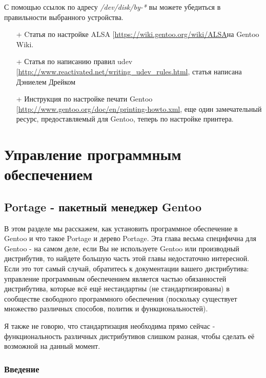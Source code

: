 \documentclass[10pt]{book}
\begin{document}
С помощью ссылок по адресу \textit{/dev/disk/by-*} вы можете убедиться в правильности выбранного устройства.

\newpage

\phantom{}
\begin{tcolorbox}[title=\textbf{Дальнейшие ресурсы}, colback=yellow!14!white, colframe=red!75!blue]
\begin{itemize}
	\item[+] Cтатья по настройке ALSA [\url{https://wiki.gentoo.org/wiki/ALSA}на Gentoo Wiki.
	\item[+] Статья по написанию правил udev [\url{http://www.reactivated.net/writing_udev_rules.html}, статья написана Дэниелем Дрейком
	\item[+] Инструкция по настройке печати Gentoo [\url{http://www.gentoo.org/doc/en/printing-howto.xml}, еще один замечательный ресурс, предоставляемый для Gentoo, теперь по настройке принтера.
\end{itemize}
\end{tcolorbox}

\newpage

\chapter{Управление программным обеспечением}

\section*{Portage - пакетный менеджер Gentoo}

В этом разделе мы расскажем, как установить программное обеспечение в Gentoo и что такое Portage и дерево Portage. Эта глава весьма специфична для Gentoo - на самом деле, если Вы не используете Gentoo или производный дистрибутив, то найдете большую часть этой главы недостаточно интересной. Если это тот самый случай, обратитесь к документации вашего дистрибутива: управление программным обеспечением является частью  обязанностей дистрибутива, которые всё ещё нестандартны (не стандартизированы) в сообществе свободного программного обеспечения (поскольку существует множество различных способов, политик и функциональностей).

Я также не говорю, что стандартизация необходима прямо сейчас - функциональность различных дистрибутивов слишком разная, чтобы сделать её возможной на данный момент.

\subsection{Введение}
\end{document}
